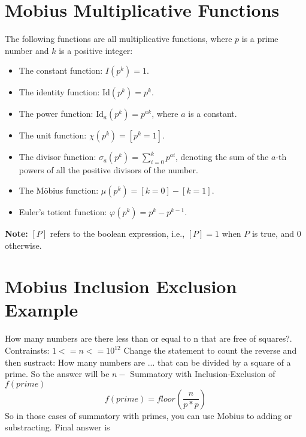 \documentclass[a4paper,landscape]{article} %
\begin{document}

\begin{multicols}{3}
\section*{Mobius Multiplicative Functions}
The following functions are all multiplicative functions, where \( p \) is a prime number and \( k \) is a positive integer:

\begin{itemize}
    \item The constant function: \( I(p^k) = 1 \).
    \item The identity function: \( \text{Id}(p^k) = p^k \).
    \item The power function: \( \text{Id}_a(p^k) = p^{ak} \), where \( a \) is a constant.
    \item The unit function: \( \chi(p^k) = [ p^k = 1 ] \).
    \item The divisor function: \( \sigma_a(p^k) = \sum_{i=0}^k p^{ai} \), denoting the sum of the \( a \)-th powers of all the positive divisors of the number.
    \item The Möbius function: \( \mu(p^k) = [ k = 0 ] - [ k = 1 ] \).
    \item Euler's totient function: \( \varphi(p^k) = p^k - p^{k-1} \).
\end{itemize}

\textbf{Note:} \([P]\) refers to the boolean expression, i.e., \([P] = 1\) when \( P \) is true, and \( 0 \) otherwise.


\section*{Mobius Inclusion Exclusion Example}
How many numbers are there less than or equal to n that are free of squares?. Contrainsts: $1 <= n <= 10^{12}$
\newline\newline
Change the statement to count the reverse and then sustract: How many numbers are ... that can be divided by a square of a prime. So the answer will be $n -$ Summatory with Inclusion-Exclusion of $f(prime)$
\newline
$$ f(prime) = floor(\frac{n}{p*p}) $$
\newline
So in those cases of summatory with primes, you can use Mobius to adding or substracting. Final answer is


\end{multicols}
\end{document}
